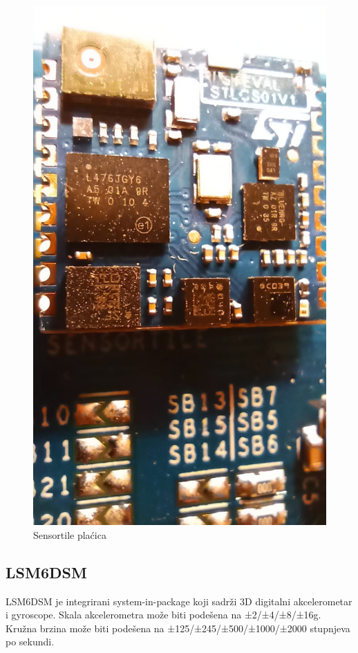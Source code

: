 \documentclass[times, utf8, diplomski]{diplomski}
\begin{document}
\begin{figure}[H]
\includegraphics[scale=0.14]{tile_close.jpeg}
\centering
\caption{Sensortile plaćica}
\end{figure}

\subsection{LSM6DSM}
LSM6DSM\cite{LSM6DSM} je integrirani system-in-package koji sadrži 3D digitalni akcelerometar i gyroscope. Skala akcelerometra može biti podešena na ±2/±4/±8/±16g. Kružna brzina može biti podešena na
±125/±245/±500/±1000/±2000 stupnjeva po sekundi.
\end{document}
